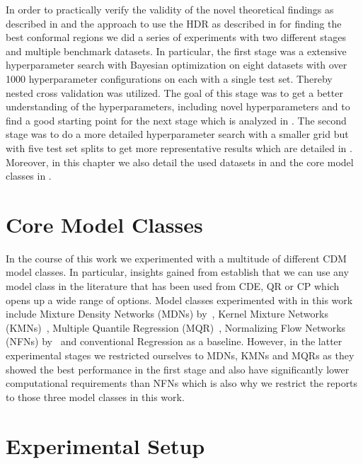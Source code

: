 In order to practically verify the validity of the novel theoretical findings as described in  and the approach to use the HDR as described in  for finding the best conformal regions we did a series of experiments with two different stages and multiple benchmark datasets. In particular, the first stage was a extensive hyperparameter search with Bayesian optimization on eight datasets with over 1000 hyperparameter configurations on each with a single test set. Thereby nested cross validation was utilized. The goal of this stage was to get a better understanding of the hyperparameters, including novel hyperparameters and to find a good starting point for the next stage which is analyzed in . The second stage was to do a more detailed hyperparameter search with a smaller grid but with five test set splits to get more representative results which are detailed in . Moreover, in this chapter we also detail the used datasets in  and the core model classes in .

\section{Core Model Classes}\label{sec:core_model_classes}

In the course of this work we experimented with a multitude of different CDM model classes. In particular, insights gained from  establish that we can use any model class in the literature that has been used from CDE, QR or CP which opens up a wide range of options. Model classes experimented with in this work include Mixture Density Networks (MDNs) by~\cite{bishop1994mixture}, Kernel Mixture Networks (KMNs)~\cite{ambrogioni2017kernel}, Multiple Quantile Regression (MQR)~\cite{gupta2022nested,moon2021learning}, Normalizing Flow Networks (NFNs) by~\cite{trippe2018conditional} and conventional Regression as a baseline. However, in the latter experimental stages we restricted ourselves to MDNs, KMNs and MQRs as they showed the best performance in the first stage and also have significantly lower computational requirements than NFNs which is also why we restrict the reports to those three model classes in this work.

\section{Experimental Setup}\label{sec:experimental_setup}

